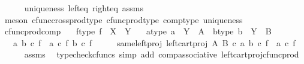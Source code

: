 \begin{isabellebody}
\ \ \ \ \isamarkupfalse%
\ uniqueness\ left{\isacharunderscore}{\kern0pt}eq\ right{\isacharunderscore}{\kern0pt}eq\ assms\ \isamarkupfalse%
\ {\isacharparenleft}{\kern0pt}meson\ cfunc{\isacharunderscore}{\kern0pt}cross{\isacharunderscore}{\kern0pt}prod{\isacharunderscore}{\kern0pt}type\ cfunc{\isacharunderscore}{\kern0pt}prod{\isacharunderscore}{\kern0pt}type\ comp{\isacharunderscore}{\kern0pt}type\ uniqueness{\isacharparenright}{\kern0pt}\isanewline
{}\isamarkupfalse%
%
\endisatagproof
{\isafoldproof}%
%
\isadelimproof
\isanewline
%
\endisadelimproof
\isanewline
{}\isamarkupfalse%
\ cfunc{\isacharunderscore}{\kern0pt}prod{\isacharunderscore}{\kern0pt}comp{\isacharcolon}{\kern0pt}\isanewline
\ \ \ f{\isacharunderscore}{\kern0pt}type{\isacharcolon}{\kern0pt}\ {\isachardoublequoteopen}f\ {\isacharcolon}{\kern0pt}\ X\ {\isasymrightarrow}\ Y{\isachardoublequoteclose}\isanewline
\ \ \ a{\isacharunderscore}{\kern0pt}type{\isacharcolon}{\kern0pt}\ {\isachardoublequoteopen}a\ {\isacharcolon}{\kern0pt}\ Y\ {\isasymrightarrow}\ A{\isachardoublequoteclose}\ \ b{\isacharunderscore}{\kern0pt}type{\isacharcolon}{\kern0pt}\ {\isachardoublequoteopen}b\ {\isacharcolon}{\kern0pt}\ Y\ {\isasymrightarrow}\ B{\isachardoublequoteclose}\isanewline
\ \ \ {\isachardoublequoteopen}{\isasymlangle}a{\isacharcomma}{\kern0pt}\ b{\isasymrangle}\ {\isasymcirc}\isactrlsub c\ f\ {\isacharequal}{\kern0pt}\ {\isasymlangle}a\ {\isasymcirc}\isactrlsub c\ f{\isacharcomma}{\kern0pt}\ b\ {\isasymcirc}\isactrlsub c\ f{\isasymrangle}{\isachardoublequoteclose}\isanewline
%
\isadelimproof
%
\endisadelimproof
%
\isatagproof
{}\isamarkupfalse%
\ {\isacharminus}{\kern0pt}\isanewline
\ \ \isamarkupfalse%
\ same{\isacharunderscore}{\kern0pt}left{\isacharunderscore}{\kern0pt}proj{\isacharcolon}{\kern0pt}\ {\isachardoublequoteopen}left{\isacharunderscore}{\kern0pt}cart{\isacharunderscore}{\kern0pt}proj\ A\ B\ {\isasymcirc}\isactrlsub c\ {\isasymlangle}a{\isacharcomma}{\kern0pt}\ b{\isasymrangle}\ {\isasymcirc}\isactrlsub c\ f\ {\isacharequal}{\kern0pt}\ a\ {\isasymcirc}\isactrlsub c\ f{\isachardoublequoteclose}\isanewline
\ \ \ \ \isamarkupfalse%
\ assms\ \isamarkupfalse%
\ {\isacharparenleft}{\kern0pt}typecheck{\isacharunderscore}{\kern0pt}cfuncs{\isacharcomma}{\kern0pt}\ simp\ add{\isacharcolon}{\kern0pt}\ comp{\isacharunderscore}{\kern0pt}associative{}\ left{\isacharunderscore}{\kern0pt}cart{\isacharunderscore}{\kern0pt}proj{\isacharunderscore}{\kern0pt}cfunc{\isacharunderscore}{\kern0pt}prod{\isacharparenright}{\kern0pt}\isanewline

\end{isabellebody}
